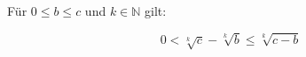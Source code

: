 Für $0 \leq b \leq c$ und $k \in \mathbb{N}$ gilt:

$$0 < \sqrt[k]{c} - \sqrt[k]{b} \leq \sqrt[k]{c-b}$$